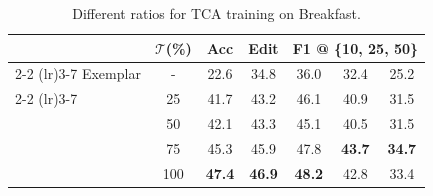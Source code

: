 \begin{table}[!h]
\centering
\begin{tabular}{lcccccc}
\toprule
&$\mathcal{T}$(\%)  & Acc & Edit & \multicolumn{3}{c}{F1 @ \{10, 25, 50\}} \\ \cmidrule(lr){2-2} \cmidrule(lr){3-7}
Exemplar& - & 22.6 & 34.8 & 36.0 & 32.4 & 25.2\\ \cmidrule(lr){2-2} \cmidrule(lr){3-7}
\multirow{4}{*}{Ours}&25 & {41.7} & {43.2} & {46.1} & {40.9} & 31.5 \\ 
&50 & {42.1} & {43.3} & {45.1} & {40.5} & 31.5 \\ 
&75 & {45.3} & {45.9} & {47.8} & \textbf{43.7} & \textbf{34.7} \\ 
\rowcolor{gray!30}\cellcolor{white} & 100 & \textbf{47.4} & \textbf{46.9} & \textbf{48.2} & {42.8} & 33.4 \\ \bottomrule
\end{tabular}
\caption{Different ratios for TCA training on Breakfast. %
}
\label{tab:vaeratio}
\end{table}